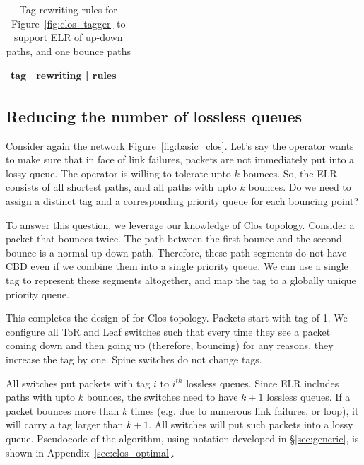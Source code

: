 \begin{table}[t]
		\centering
		\footnotesize
		\begin{tabular}{|c|c|c|} \hline
				tag & rewriting | rules \\ \hline 
		\end{tabular}
		\caption{Tag rewriting rules for Figure~\ref{fig:clos_tagger} to support
		ELR of up-down paths, and one bounce paths}
		\label{fig:tab_tag_rules}
		\vspace{-1em}
\end{table}

\subsection{Reducing the number of lossless queues}
\label{subsec:combine}

Consider again the network Figure~\ref{fig:basic_clos}.  Let's say the operator
wants to make sure that in face of link failures, packets are not immediately
put into a lossy queue. The operator is willing to tolerate upto $k$ bounces.
So, the ELR consists of all shortest paths, and all paths with upto $k$ bounces.
Do we need to assign a distinct tag and a corresponding priority queue for each
bouncing point?

To answer this question, we leverage our knowledge of Clos topology.  Consider a
packet that bounces twice. The path between the first bounce and the second
bounce is a normal up-down path. Therefore, these path segments do not have CBD
even if we combine them into a single priority queue. We can use a single tag to
represent these segments altogether, and map the tag to a globally unique
priority queue.

This completes the design of \sysname{} for Clos topology. Packets start with
tag of 1. We configure all ToR and Leaf switches such that every time they see
a packet coming down and then going up (therefore, bouncing) for any reasons,
they increase the tag by one. Spine switches do not change tags.

All switches put packets with tag $i$ to $i^{th}$ lossless queues. Since ELR
includes paths with upto $k$ bounces, the switches need to have $k+1$ lossless
queues. If a packet bounces more than $k$ times (e.g. due to numerous link
failures, or loop), it will carry a tag larger than $k+1$. All switches will put
such packets into a lossy queue.  Pseudocode of the algorithm, using notation
developed in \S\ref{sec:generic}, is shown in Appendix~\ref{sec:clos_optimal}.

